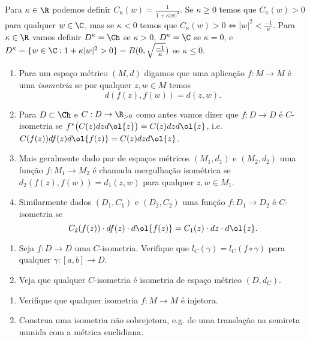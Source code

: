 Para $\kappa\in\R$ podemos definir $C_\kappa(w) = \frac{1}{1+\kappa |w|^2}$.
Se $\kappa\geq0$ temos que $C_\kappa(w) > 0$ para qualquer $w\in\C$,
mas se $\kappa<0$ temos que $C_\kappa(w) > 0 \iff |w|^2 < \frac{-1}{\kappa}$.
Para $\kappa\in\R$ vamos definir 
$D^\kappa = \Ch$ se $\kappa>0$,
$D^\kappa = \C$ se $\kappa = 0$,
e $D^\kappa = \{w\in\C: 1+\kappa|w|^2>0\} = B(0,\sqrt{\frac{-1}{\kappa}})$ se $\kappa\leq 0$.

\begin{defin}[Isometrias]
\begin{enumerate}
\item Para um espaço métrico $(M,d)$ digamos que uma aplicação $f: M \to M$ é uma \emph{isometria}
se por qualquer $z,w\in M$ temos
\begin{equation*}
d(f(z),f(w)) = d(z,w).
\end{equation*}
\item Para $D\subset\Ch$ e $C: D \to \R_{>0}$ como antes vamos dizer que $f: D \to D$ é $C$-isometria
se $f^* \big( C(z) dz d\ol{z} \big) = C(z) dz d\ol{z}$, i.e.
$C(f(z)) df(z) d\ol{f(z)} = C(z) dz d\ol{z}$.
\item Mais geralmente dado par de espaços métricos $(M_1,d_1)$ e $(M_2,d_2)$ uma função $f: M_1 \to M_2$
é chamada mergulhação isométrica se $d_2(f(z),f(w)) = d_1(z,w)$ para qualquer $z,w\in M_1$.
\item Similarmente dados $(D_1,C_1)$ e $(D_2,C_2)$ uma função $f: D_1 \to D_2$ é $C$-isometria se
\begin{equation*}
C_2(f(z)) \cdot df(z) \cdot d\ol{f(z)} = C_1(z) \cdot dz \cdot d\ol{z}.
\end{equation*}
\end{enumerate}
\end{defin}

\begin{problema}
\begin{enumerate}
\item Seja $f: D \to D$ uma $C$-isometria. Verifique que $l_C(\gamma) = l_C(f\circ \gamma)$ para qualquer $\gamma: [a,b] \to D$.
\item Veja que qualquer $C$-isometria é isometria de espaço métrico $(D,d_C)$.
\end{enumerate}
\end{problema}

\begin{problema}
\begin{enumerate}
\item Verifique que qualquer isometria $f: M \to M$ é injetora.
\item Construa uma isometria não sobrejetora, e.g. de uma translação na semireta munida com a métrica euclidiana.
\end{enumerate}
\end{problema}

